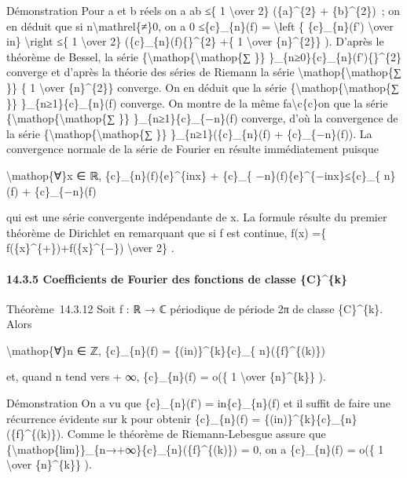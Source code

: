 \documentclass[]{article}
\begin{document}
Démonstration Pour a et b réels on a ab ≤\{ 1 \textbackslash{}over 2\}
(\{a\}\^{}\{2\} + \{b\}\^{}\{2\})~; on en déduit que si
n\textbackslash{}mathrel\{≠\}0, on a 0
≤\textbar{}\{c\}\_\{n\}(f)\textbar{} = \textbackslash{}left \textbar{}\{
\{c\}\_\{n\}(f') \textbackslash{}over in\} \textbackslash{}right
\textbar{}≤\{ 1 \textbackslash{}over 2\}
(\textbar{}\{c\}\_\{n\}(f)\{\textbar{}\}\^{}\{2\} +\{ 1
\textbackslash{}over \{n\}\^{}\{2\}\} ). D'après le théorème de Bessel,
la série \{\textbackslash{}mathop\{\textbackslash{}mathop\{∑ \}\}
\}\_\{n≥0\}\textbar{}\{c\}\_\{n\}(f')\{\textbar{}\}\^{}\{2\} converge et
d'après la théorie des séries de Riemann la série
\textbackslash{}mathop\{\textbackslash{}mathop\{∑ \}\} \{ 1
\textbackslash{}over \{n\}\^{}\{2\}\} converge. On en déduit que la
série \{\textbackslash{}mathop\{\textbackslash{}mathop\{∑ \}\}
\}\_\{n≥1\}\textbar{}\{c\}\_\{n\}(f)\textbar{} converge. On montre de la
même fa\textbackslash{}c\{c\}on que la série
\{\textbackslash{}mathop\{\textbackslash{}mathop\{∑ \}\}
\}\_\{n≥1\}\textbar{}\{c\}\_\{−n\}(f)\textbar{} converge, d'où la
convergence de la série
\{\textbackslash{}mathop\{\textbackslash{}mathop\{∑ \}\}
\}\_\{n≥1\}(\textbar{}\{c\}\_\{n\}(f)\textbar{} +
\textbar{}\{c\}\_\{−n\}(f)\textbar{}). La convergence normale de la
série de Fourier en résulte immédiatement puisque

\textbackslash{}mathop\{∀\}x ∈ ℝ,
\textbar{}\{c\}\_\{n\}(f)\{e\}\^{}\{inx\} + \{c\}\_\{
−n\}(f)\{e\}\^{}\{−inx\}\textbar{}≤\textbar{}\{c\}\_\{ n\}(f)\textbar{}
+ \textbar{}\{c\}\_\{−n\}(f)\textbar{}

qui est une série convergente indépendante de x. La formule résulte du
premier théorème de Dirichlet en remarquant que si f est continue, f(x)
=\{ f(\{x\}\^{}\{+\})+f(\{x\}\^{}\{−\}) \textbackslash{}over 2\} .

\paragraph{14.3.5 Coefficients de Fourier des fonctions de classe
\{C\}\^{}\{k\}}

Théorème~14.3.12 Soit f : ℝ → ℂ périodique de période 2π de classe
\{C\}\^{}\{k\}. Alors

\textbackslash{}mathop\{∀\}n ∈ ℤ, \{c\}\_\{n\}(f) =
\{(in)\}\^{}\{k\}\{c\}\_\{ n\}(\{f\}\^{}\{(k)\})

et, quand \textbar{}n\textbar{} tend vers + ∞, \{c\}\_\{n\}(f) = o(\{ 1
\textbackslash{}over \{n\}\^{}\{k\}\} ).

Démonstration On a vu que \{c\}\_\{n\}(f') = in\{c\}\_\{n\}(f) et il
suffit de faire une récurrence évidente sur k pour obtenir
\{c\}\_\{n\}(f) = \{(in)\}\^{}\{k\}\{c\}\_\{n\}(\{f\}\^{}\{(k)\}). Comme
le théorème de Riemann-Lebesgue assure que
\{\textbackslash{}mathop\{lim\}\}\_\{\textbar{}n\textbar{}→+∞\}\{c\}\_\{n\}(\{f\}\^{}\{(k)\})
= 0, on a \{c\}\_\{n\}(f) = o(\{ 1 \textbackslash{}over \{n\}\^{}\{k\}\}
).
\end{document}
